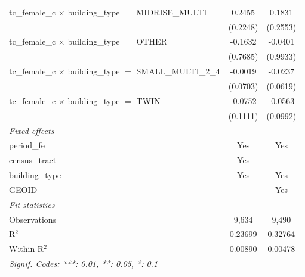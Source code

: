 \begin{tabular}{lcc}
   tc\_female\_c $\times$ building\_type $=$ MIDRISE\_MULTI            & 0.2455         & 0.1831\\   
                                                                       & (0.2248)       & (0.2553)\\   
   tc\_female\_c $\times$ building\_type $=$ OTHER                     & -0.1632        & -0.0401\\   
                                                                       & (0.7685)       & (0.9933)\\   
   tc\_female\_c $\times$ building\_type $=$ SMALL\_MULTI\_2\_4        & -0.0019        & -0.0237\\   
                                                                       & (0.0703)       & (0.0619)\\   
   tc\_female\_c $\times$ building\_type $=$ TWIN                      & -0.0752        & -0.0563\\   
                                                                       & (0.1111)       & (0.0992)\\   
   \midrule
   \emph{Fixed-effects}\\
   period\_fe                                                          & Yes            & Yes\\  
   census\_tract                                                       & Yes            & \\  
   building\_type                                                      & Yes            & Yes\\  
   GEOID                                                               &                & Yes\\  
   \midrule
   \emph{Fit statistics}\\
   Observations                                                        & 9,634          & 9,490\\  
   R$^2$                                                               & 0.23699        & 0.32764\\  
   Within R$^2$                                                        & 0.00890        & 0.00478\\  
   \midrule \midrule
   \multicolumn{3}{l}{\emph{Signif. Codes: ***: 0.01, **: 0.05, *: 0.1}}\\
\end{tabular}
\par\endgroup
\begingroup
\centering
